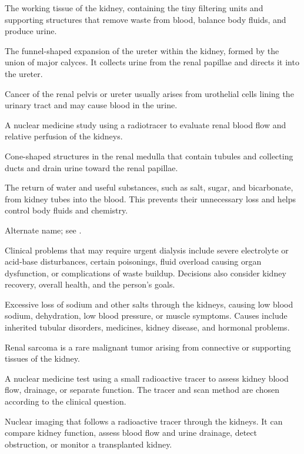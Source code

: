  The working tissue of the kidney, containing the tiny filtering units and supporting structures that remove waste from blood, balance body fluids, and produce urine.

 The funnel-shaped expansion of the ureter within the kidney, formed by the union of
major calyces. It collects urine from the renal papillae and directs it into the ureter.

 Cancer of the renal pelvis or ureter usually arises from urothelial cells lining the urinary tract and may cause blood in the urine.

 A nuclear medicine study using a radiotracer to evaluate renal blood flow and relative perfusion of the kidneys.

 Cone-shaped structures in the renal medulla that contain tubules and collecting ducts and drain urine toward the renal papillae.

 The return of water and useful substances, such as salt, sugar, and bicarbonate, from kidney tubes into the blood. This prevents their unnecessary loss and helps control body fluids and chemistry.

 Alternate name; see .

 Clinical problems that may require urgent dialysis include severe electrolyte or acid-base disturbances, certain poisonings, fluid overload causing organ dysfunction, or complications of waste buildup. Decisions also consider kidney recovery, overall health, and the person's goals.

 Excessive loss of sodium and other salts through the kidneys, causing low blood sodium, dehydration, low blood pressure, or muscle symptoms. Causes include inherited tubular disorders, medicines, kidney disease, and hormonal problems.

 Renal sarcoma is a rare malignant tumor arising from connective or supporting tissues of the kidney.

 A nuclear medicine test using a small radioactive tracer to assess kidney blood flow, drainage, or separate function. The tracer and scan method are chosen according to the clinical question.

 Nuclear imaging that follows a radioactive tracer through the kidneys. It can compare kidney function, assess blood flow and urine drainage, detect obstruction, or monitor a transplanted kidney.

